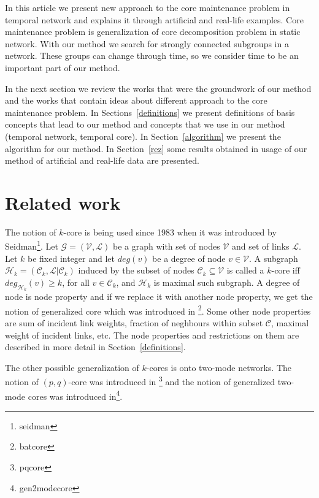 \documentclass[a4paper,twoside,10pt]{article}
\newcommand{\C}{\mathcal{C}}
\begin{document}
In this article we present new approach to the core maintenance problem in temporal network and explains it through artificial and real-life examples. Core maintenance problem is generalization of core decomposition problem in static network. With our method we search for strongly connected subgroups in a network. These groups can change through time, so we consider time to be an important part of our method.

In the next section we review the works that were the groundwork of our method and the works that contain ideas about different approach to the core maintenance problem. In Sections~\ref{definitions} we present definitions of basis concepts that lead to our method and concepts that we use in our method (temporal network, temporal core). In Section~\ref{algorithm} we present the algorithm for our method. In Section~\ref{rez} some results obtained in usage of our method of artificial and real-life data are presented.




%
%

\section{Related work}\label{related}

The notion of $k$-core is being used since 1983 when it was introduced by Seidman\footnote{seidman}. Let $\mathcal{G} = (\mathcal{V}, \mathcal{L})$ be a graph with set of nodes $\mathcal{V}$ and set of links $\mathcal{L}$. Let $k$ be fixed integer and let $deg(v)$ be a degree of node $v \in \mathcal{V}$. A subgraph $\mathcal{H}_k = (\C_k, \mathcal{L}|\C_k)$ induced by the subset of nodes $\C_k \subseteq \mathcal{V}$ is called a $k$-core iff $deg_{\mathcal{H}_k}(v) \geq k$, for all $v \in \C_k$, and $\mathcal{H}_k$ is maximal such subgraph. A degree of node is node property and if we replace it with another node property, we get the notion of generalized core which was introduced in \footnote{batcore}. Some other node properties are sum of incident link weights, fraction of neghbours within subset $\C$, maximal weight of incident links, etc. The node properties and restrictions on them are described in more detail in Section~\ref{definitions}.

The other possible generalization of $k$-cores is onto two-mode networks. The notion of $(p, q)$-core was introduced in \footnote{pqcore} and the notion of generalized two-mode cores was introduced in\footnote{gen2modecore}.
\end{document}
